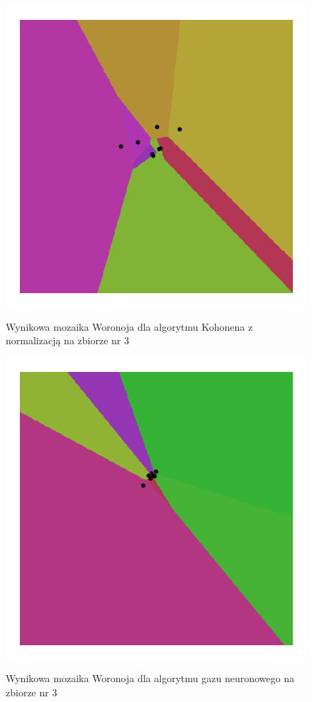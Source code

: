\documentclass{classrep}
\begin{document}
\begin{figure}[h]
	\centering
		\includegraphics[scale=0.55]{pictures/kohonen_8_neuronow_zbior_2_normalized.png}
	\label{fig:kohonen_8_neuronow_zbior_2_normalized}
	\caption{Wynikowa mozaika Woronoja dla algorytmu Kohonena z normalizacją na zbiorze nr 3}
\end{figure}

\begin{figure}[h]
	\centering
		\includegraphics[scale=0.55]{pictures/neuralgas_8_neuronow_zbior_2.png}
	\label{fig:neuralgas_8_neuronow_zbior_2}
	\caption{Wynikowa mozaika Woronoja dla algorytmu gazu neuronowego na zbiorze nr 3}
\end{figure}
\end{document}

